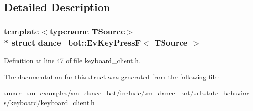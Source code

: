 \subsection{Detailed Description}
\subsubsection*{template$<$typename T\+Source$>$\\*
struct dance\+\_\+bot\+::\+Ev\+Key\+Press\+F$<$ T\+Source $>$}



Definition at line 47 of file keyboard\+\_\+client.\+h.



The documentation for this struct was generated from the following file\+:\begin{DoxyCompactItemize}
\item 
smacc\+\_\+sm\+\_\+examples/sm\+\_\+dance\+\_\+bot/include/sm\+\_\+dance\+\_\+bot/substate\+\_\+behaviors/keyboard/\hyperlink{keyboard__client_8h}{keyboard\+\_\+client.\+h}\end{DoxyCompactItemize}
